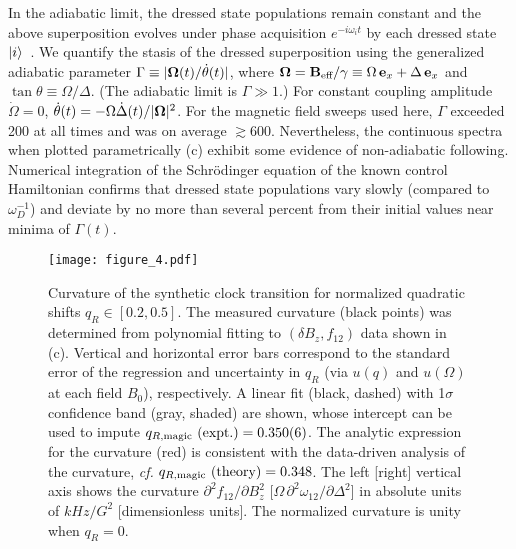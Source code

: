 \documentclass[aps,prl,reprint,superscriptaddress,floatfix]{revtex4-1}
\begin{document}
In the adiabatic limit, the dressed state populations remain constant and the above superposition evolves under phase acquisition $e^{-i \omega_i t}$ by each dressed state $\vert i \rangle $~\cite{messiah_quantum_1962}. 
We quantify the stasis of the dressed superposition using the generalized adiabatic parameter $\Gamma \equiv \vert \mathbf{\Omega}(t)/\dot{\theta}(t) \vert $, where $\mathbf{\Omega} = \mathbf{B}_{\text{eff}} / \gamma \equiv \Omega \, \mathbf{e}_x + \Delta \, \mathbf{e}_x$ and $\tan \theta \equiv \Omega / \Delta$.
(The adiabatic limit is $\Gamma\gg 1$.)
For constant coupling amplitude $\dot{\Omega} = 0$, $\dot{\theta}(t) = -\Omega \dot{\Delta}(t)/\vert \mathbf{\Omega} \vert ^2$.
For the magnetic field sweeps used here, $\Gamma$ exceeded 200 at all times and was on average $\gtrsim 600$.
Nevertheless, the continuous spectra when plotted parametrically (c) exhibit some evidence of non-adiabatic following.
Numerical integration of the Schr\"{o}dinger equation of the known control Hamiltonian confirms that dressed state populations vary slowly (compared to $\omega_D^{-1}$) and deviate by no more than several percent from their initial values near minima of $\Gamma(t)$.
\begin{figure}
    \texttt{[image: figure\_4.pdf]}
    \caption{
    \label{fig:curvature_vs_qR}
        Curvature of the synthetic clock transition for normalized quadratic shifts $q_R \in [0.2, 0.5]$.
        The measured curvature (black points) was determined from polynomial fitting to $(\delta B_z, f_{12})$ data shown in (c).
        Vertical and horizontal error bars correspond to the standard error of the regression and uncertainty in $q_R$ (via $u(q)$ and $u(\Omega)$ at each field $B_0$), respectively.
        A linear fit (black, dashed) with 1$\sigma$ confidence band (gray, shaded) are shown, whose intercept can be used to impute $q_{R,\text{magic}}\text{ (expt.)} = 0.350(6)$.
        The analytic expression for the curvature (red) is consistent with the data-driven analysis of the curvature, \textit{cf.} $q_{R,\text{magic}}\text{ (theory)} = 0.348$.
        The left [right] vertical axis shows the curvature $\partial^2 f_{12}/\partial B_z^2$ [$\Omega\, \partial^2\omega_{12}/\partial \Delta^2$] in absolute units of $\unit{kHz/G^2}$ [dimensionless units].
        The normalized curvature is unity when $q_R=0$.
    }
\end{figure}
 
\end{document}
